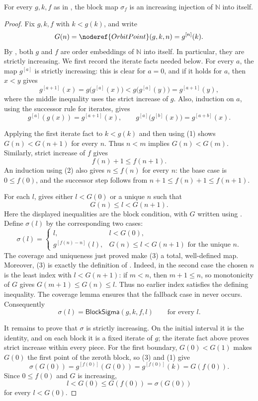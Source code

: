 \begin{lemma}
For every $g,k,f$ as in , the block map $\sigma_f$ is
an increasing injection of $\mathbb N$ into itself.
\end{lemma}
\begin{proof}
Fix $g,k,f$ with $k<g(k)$, and write
\[
G(n)=\noderef{OrbitPoint}(g,k,n)=g^{[n]}(k).
\]
By , both $g$ and $f$ are order embeddings of $\mathbb N$
into itself.  In particular, they are strictly increasing.  We first record
the iterate facts needed below.  For every $a$, the map $g^{[a]}$ is strictly
increasing: this is clear for $a=0$, and if it holds for $a$, then
$x<y$ gives
\[
g^{[a+1]}(x)=g\bigl(g^{[a]}(x)\bigr)
 <g\bigl(g^{[a]}(y)\bigr)=g^{[a+1]}(y),
\]
where the middle inequality uses the strict increase of $g$.  Also, induction
on $a$, using the successor rule for iterates, gives
\[
g^{[a]}(g(x))=g^{[a+1]}(x),
\qquad
g^{[a]}\bigl(g^{[b]}(x)\bigr)=g^{[a+b]}(x).
\tag{1}
\]

Applying the first iterate fact to $k<g(k)$ and then using (1) shows
$G(n)<G(n+1)$ for every $n$.  Thus $n<m$ implies $G(n)<G(m)$.  Similarly,
strict increase of $f$ gives
\[
f(n)+1\leq f(n+1).
\tag{2}
\]
An induction using (2) also gives $n\leq f(n)$ for every $n$: the base case
is $0\leq f(0)$, and the successor step follows from
$n+1\leq f(n)+1\leq f(n+1)$.

For each $l$,  gives either $l<G(0)$ or a
unique $n$ such that
\[
G(n)\leq l<G(n+1).
\]
Here the displayed inequalities are the block condition, with $G$ written
using .  Define $\sigma(l)$ by the corresponding two
cases:
\[
\sigma(l)=
\begin{cases}
l,&l<G(0),\\
g^{[f(n)-n]}(l),&G(n)\leq l<G(n+1)\text{ for the unique }n.
\end{cases}
\tag{3}
\]
The coverage and uniqueness just proved make (3) a total, well-defined map.
Moreover, (3) is exactly the definition of .  Indeed, in
the second case the chosen $n$ is the least index with $l<G(n+1)$: if $m<n$,
then $m+1\leq n$, so monotonicity of $G$ gives
$G(m+1)\leq G(n)\leq l$.  Thus no earlier index satisfies the defining
inequality.  The coverage lemma ensures that the fallback case in
 never occurs.  Consequently
\[
\sigma(l)=\mathsf{BlockSigma}(g,k,f,l)
\qquad\text{for every }l.
\tag{4}
\]

It remains to prove that $\sigma$ is strictly increasing.  On the initial
interval it is the identity, and on each block it is a fixed iterate of $g$;
the iterate fact above proves strict increase within every piece.  For the
first boundary, $G(0)<G(1)$ makes $G(0)$ the first point of the zeroth block,
so (3) and (1) give
\[
\sigma(G(0))=g^{[f(0)]}(G(0))=g^{[f(0)]}(k)=G(f(0)).
\]
Since $0\leq f(0)$ and $G$ is increasing,
\[
l<G(0)\leq G(f(0))=\sigma(G(0))
\tag{5}
\]
for every $l<G(0)$.


\end{proof}

